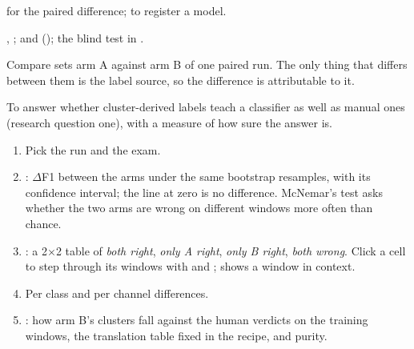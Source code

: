  for the paired difference;  to register a model.

\begin{underthehood}
, ;  and
 (); the blind test in
.
\end{underthehood}

Compare sets arm A against arm B of one paired run. The only thing that differs between them is the
label source, so the difference is attributable to it.

To answer whether cluster-derived labels teach a classifier as well as manual ones (research question
one), with a measure of how sure the answer is.


\begin{enumerate}
  \item Pick the run and the exam.
  \item {}: \(\Delta\)F1 between the arms under the same bootstrap resamples,
        with its confidence interval; the line at zero is no difference. McNemar's test asks whether
        the two arms are wrong on different windows more often than chance.
  \item {}: a 2\(\times\)2 table of \emph{both right}, \emph{only A
        right}, \emph{only B right}, \emph{both wrong}. Click a cell to step through its windows with
         and ;  shows a window in context.
  \item Per class and per channel differences.
  \item {}: how arm B's clusters fall against the human verdicts on
        the training windows, the translation table fixed in the recipe, and purity.
\end{enumerate}

